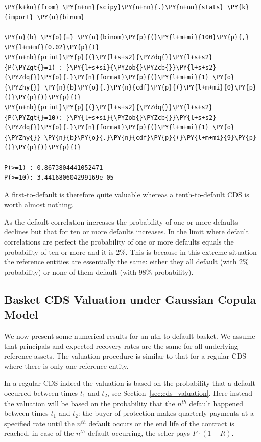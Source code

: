 \begin{codebox}
\begin{Verbatim}[commandchars=\\\{\}]
\PY{k+kn}{from} \PY{n+nn}{scipy}\PY{n+nn}{.}\PY{n+nn}{stats} \PY{k}{import} \PY{n}{binom}
	
\PY{n}{b} \PY{o}{=} \PY{n}{binom}\PY{p}{(}\PY{l+m+mi}{100}\PY{p}{,} \PY{l+m+mf}{0.02}\PY{p}{)}
\PY{n+nb}{print}\PY{p}{(}\PY{l+s+s2}{\PYZdq{}}\PY{l+s+s2}{P(\PYZgt{}=1) : }\PY{l+s+si}{\PYZob{}\PYZcb{}}\PY{l+s+s2}{\PYZdq{}}\PY{o}{.}\PY{n}{format}\PY{p}{(}\PY{l+m+mi}{1} \PY{o}{\PYZhy{}} \PY{n}{b}\PY{o}{.}\PY{n}{cdf}\PY{p}{(}\PY{l+m+mi}{0}\PY{p}{)}\PY{p}{)}\PY{p}{)}
\PY{n+nb}{print}\PY{p}{(}\PY{l+s+s2}{\PYZdq{}}\PY{l+s+s2}{P(\PYZgt{}=10): }\PY{l+s+si}{\PYZob{}\PYZcb{}}\PY{l+s+s2}{\PYZdq{}}\PY{o}{.}\PY{n}{format}\PY{p}{(}\PY{l+m+mi}{1} \PY{o}{\PYZhy{}} \PY{n}{b}\PY{o}{.}\PY{n}{cdf}\PY{p}{(}\PY{l+m+mi}{9}\PY{p}{)}\PY{p}{)}\PY{p}{)}
	
P(>=1) : 0.8673804441052471
P(>=10): 3.441680604299169e-05
\end{Verbatim}
\end{codebox}

A first-to-default is therefore quite valuable whereas a tenth-to-default CDS is worth almost nothing.

As the default correlation increases the probability of one or more defaults declines 
but that for ten or more defaults increases. In the limit where default correlations are perfect the probability of one or more defaults equals the probability of ten or more and it is 2\%. This is because in this extreme situation the reference entities are essentially the same: either they all default (with 2\% probability) or none of them default (with 98\% probability).

\subsection{Basket CDS Valuation under Gaussian Copula Model}
\label{basket-cds-valuation-under-market-standard-model}
We now present some numerical results for an nth-to-default basket.
We assume that principals and expected recovery rates are the same
for all underlying reference assets. The valuation procedure is similar
to that for a regular CDS where there is only one reference entity.

In a regular CDS indeed the valuation is based on the probability that a
default occurred between times \(t_1\) and \(t_2\), see Section~\ref{sec:cds_valuation}. Here instead the valuation will be based on the probability that the $n^{th}$ default happened between times \(t_1\) and \(t_2\):
the buyer of protection makes quarterly payments at a
specified rate until the $n^{th}$ default occurs or the end life
of the contract is reached,
in case of the $n^{th}$ default occurring, the seller pays
\(F\cdot(1-R)\). 

